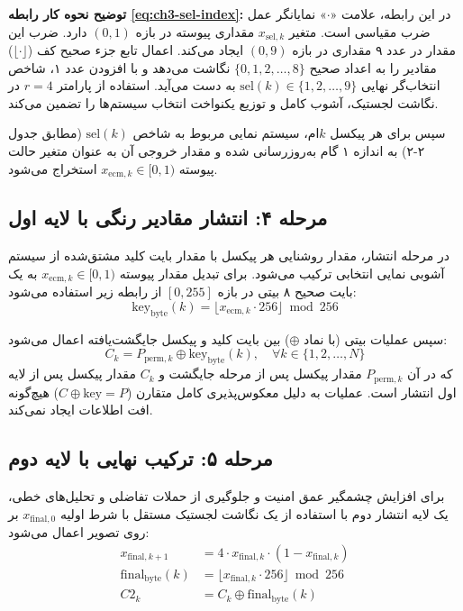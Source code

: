 \textbf{توضیح نحوه کار رابطه \eqref{eq:ch3-sel-index}:}
در این رابطه، علامت «$\cdot$» نمایانگر عمل ضرب مقیاسی است. متغیر $x_{\mathrm{sel},k}$ مقداری پیوسته در بازه $(0, 1)$ دارد. ضرب این مقدار در عدد ۹ مقداری در بازه $(0, 9)$ ایجاد می‌کند. اعمال تابع جزء صحیح کف ($\lfloor \cdot \rfloor$) مقادیر را به اعداد صحیح $\{0, 1, 2, \dots, 8\}$ نگاشت می‌دهد و با افزودن عدد ۱، شاخص انتخاب‌گر نهایی $\mathrm{sel}(k) \in \{1, 2, \dots, 9\}$ به دست می‌آید. استفاده از پارامتر $r=4$ در نگاشت لجستیک، آشوب کامل و توزیع یکنواخت انتخاب سیستم‌ها را تضمین می‌کند\cite{ref5}.

سپس برای هر پیکسل $k$ام، سیستم نمایی مربوط به شاخص $\mathrm{sel}(k)$ (مطابق جدول ۲-۲) به اندازه ۱ گام به‌روزرسانی شده و مقدار خروجی آن به عنوان متغیر حالت پیوسته $x_{\mathrm{ecm},k} \in [0, 1)$ استخراج می‌شود.

\subsection{مرحله ۴: انتشار مقادیر رنگی با لایه اول }

در مرحله انتشار، مقدار روشنایی هر پیکسل با مقدار بایت کلید مشتق‌شده از سیستم آشوبی نمایی انتخابی ترکیب می‌شود. برای تبدیل مقدار پیوسته $x_{\mathrm{ecm},k} \in [0, 1)$ به یک بایت صحیح ۸ بیتی در بازه $[0, 255]$ از رابطه زیر استفاده می‌شود:
\begin{equation}
\mathrm{key}_{\mathrm{byte}}(k) = \lfloor x_{\mathrm{ecm},k} \cdot 256 \rfloor \bmod 256
\label{eq:ch3-keybyte}
\end{equation}

سپس عملیات بیتی  (با نماد $\oplus$) بین بایت کلید و پیکسل جایگشت‌یافته اعمال می‌شود:
\begin{equation}
C_k = P_{\mathrm{perm},k} \oplus \mathrm{key}_{\mathrm{byte}}(k), \quad \forall k \in \{1, 2, \ldots, N\}
\label{eq:ch3-xor}
\end{equation}
که در آن $P_{\mathrm{perm},k}$ مقدار پیکسل پس از مرحله جایگشت و $C_k$ مقدار پیکسل پس از لایه اول انتشار است. عملیات  به دلیل معکوس‌پذیری کامل متقارن ($C \oplus \mathrm{key} = P$) هیچ‌گونه افت اطلاعات ایجاد نمی‌کند.

\subsection{مرحله ۵: ترکیب نهایی با لایه دوم }

برای افزایش چشمگیر عمق امنیت و جلوگیری از حملات تفاضلی و تحلیل‌های خطی، یک لایه انتشار دوم با استفاده از یک نگاشت لجستیک مستقل با شرط اولیه $x_{\mathrm{final},0}$ بر روی تصویر اعمال می‌شود:
\begin{align}
x_{\mathrm{final},k+1} &= 4 \cdot x_{\mathrm{final},k} \cdot (1 - x_{\mathrm{final},k}) \\
\mathrm{final}_{\mathrm{byte}}(k) &= \lfloor x_{\mathrm{final},k} \cdot 256 \rfloor \bmod 256 \\
C2_k &= C_k \oplus \mathrm{final}_{\mathrm{byte}}(k)
\label{eq:ch3-xor-final}
\end{align}

